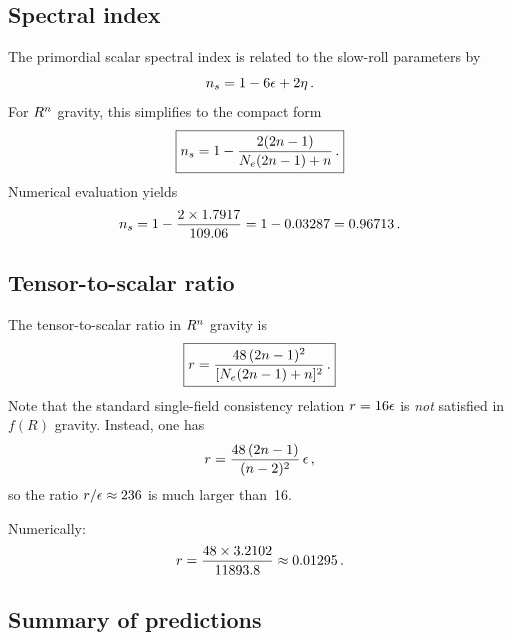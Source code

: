 \documentclass[a4paper,11pt]{article}
\begin{document}
\subsection{Spectral index}

The primordial scalar spectral index is related to the slow-roll
parameters by
\begin{equation}
  n_s = 1 - 6\epsilon + 2\eta\,.
  \label{eq:ns_general}
\end{equation}
For $R^n$ gravity, this simplifies to the compact form
\begin{equation}
  \boxed{%
    \ns = 1 - \frac{2(2\nfR-1)}{\Ne(2\nfR-1)+\nfR}\,.
  }
  \label{eq:ns_formula}
\end{equation}
Numerical evaluation yields
\begin{equation}
  n_s = 1 - \frac{2 \times 1.7917}{109.06}
      = 1 - 0.03287
      = 0.96713\,.
  \label{eq:ns_value}
\end{equation}

\subsection{Tensor-to-scalar ratio}

The tensor-to-scalar ratio in $R^n$ gravity is
\begin{equation}
  \boxed{%
    \rts = \frac{48\,(2\nfR-1)^2}{[\Ne(2\nfR-1)+\nfR]^2}\,.
  }
  \label{eq:r_formula}
\end{equation}
Note that the standard single-field consistency relation
$r = 16\epsilon$ is \emph{not} satisfied in $f(R)$ gravity.
Instead, one has
\begin{equation}
  r = \frac{48\,(2n-1)}{(n-2)^2}\,\epsilon\,,
  \label{eq:r_from_eps}
\end{equation}
so the ratio $r / \epsilon \approx 236$ is much larger than~16.

Numerically:
\begin{equation}
  r = \frac{48 \times 3.2102}{11893.8}
       \approx 0.01295\,.
  \label{eq:r_value}
\end{equation}

\subsection{Summary of predictions}
\end{document}
